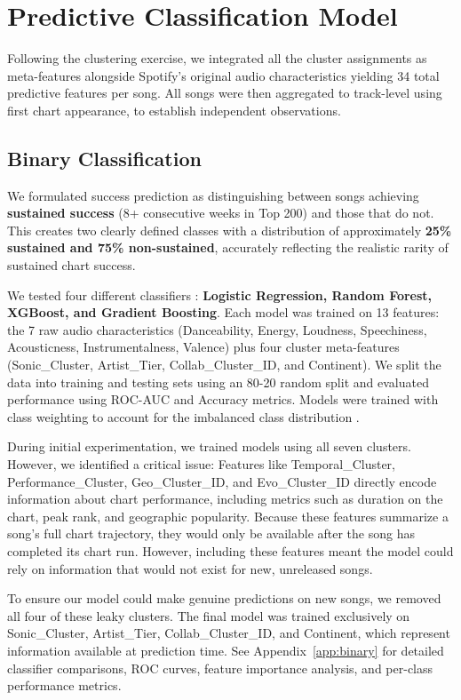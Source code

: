 \documentclass{article}
\begin{document}
\section{Predictive Classification Model}
\vspace{-0.6em}
Following the clustering exercise, we integrated all the cluster assignments as meta-features alongside Spotify's original audio characteristics yielding 34 total predictive features per song. All songs were then aggregated to track-level using first chart appearance, to establish independent observations.

\subsection{Binary Classification}
We formulated success prediction as distinguishing between songs achieving \textbf{sustained success} (8+ consecutive weeks in Top 200) and those that do not. This creates two clearly defined classes with a distribution of approximately \textbf{25\% sustained and 75\% non-sustained}, accurately reflecting the realistic rarity of sustained chart success.

We tested four different classifiers \cite{Bahel2020}: \textbf{Logistic Regression, Random Forest, XGBoost, and Gradient Boosting}. Each model was trained on 13 features: the 7 raw audio characteristics (Danceability, Energy, Loudness, Speechiness, Acousticness, Instrumentalness, Valence) plus four cluster meta-features (Sonic\_Cluster, Artist\_Tier, Collab\_Cluster\_ID, and Continent). We split the data into training and testing sets using an 80-20 random split and evaluated performance using ROC-AUC and Accuracy metrics. Models were trained with class weighting to account for the imbalanced class distribution \cite{ding2022imbalanced}.

During initial experimentation, we trained models using all seven clusters. However, we identified a critical issue: Features like Temporal\_Cluster, Performance\_Cluster, Geo\_Cluster\_ID, and Evo\_Cluster\_ID directly encode information about chart performance, including metrics such as duration on the chart, peak rank, and geographic popularity. Because these features summarize a song's full chart trajectory, they would only be available after the song has completed its chart run. However, including these features meant the model could rely on information that would not exist for new, unreleased songs.

To ensure our model could make genuine predictions on new songs, we removed all four of these leaky clusters. The final model was trained exclusively on Sonic\_Cluster, Artist\_Tier, Collab\_Cluster\_ID, and Continent, which represent information available at prediction time.
See Appendix~\ref{app:binary} for detailed classifier comparisons, ROC curves, feature importance analysis, and per-class performance metrics.
\end{document}
